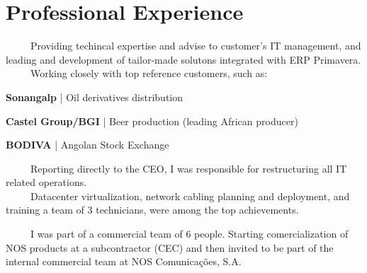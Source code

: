 \documentclass[letterpaper]{deedy-resume} %
\begin{document}
\begin{minipage}[t]{0.66\textwidth}

\section{Professional Experience}


\-\	\ \ \ \ Providing techincal expertise and advise to customer's IT management, and leading and development of tailor-made solutons integrated with ERP Primavera.\\
\-\	\ \ \ \ Working closely with top reference customers, such as:\\
\vspace{\topsep}
\begin{tightitemize}
	\item \textbf{Sonangalp} | Oil derivatives distribution
	\item \textbf{Castel Group/BGI} | Beer production (leading African producer)
	\item \textbf{BODIVA} | Angolan Stock Exchange
\end{tightitemize}

\sectionspace


\-\	\ \ \ \ Reporting directly to the CEO, I was responsible for restructuring all IT related operations.\\
\-\	\ \ \ \ Datacenter virtualization, network cabling planning and deployment, and training a team of 3 technicians, were among the top achievements.\\

\sectionspace



\-\	\ \ \ \ I was part of a commercial team of 6 people. Starting comercialization of NOS products at a subcontractor (CEC) and then invited to be part of the internal commercial team at NOS Comunicações, S.A.

\sectionspace


\end{minipage}
\end{document}
